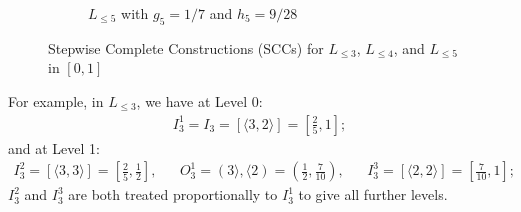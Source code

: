 \documentclass{ws-ijnt}
\newlength{\mytikzwidth}
\begin{document}
\begin{figure}
\begin{subfigure}[b]{\textwidth}
			
			\label{fig: L_5}
			\caption{ $L_{\leq 5}$ with $g_5=1/7$ and $h_5=9/28$}
		\end{subfigure}
		
		\caption{Stepwise Complete Constructions (SCCs) for $L_{\leq 3}$, $L_{\leq 4}$, and $L_{\leq 5}$ in $[0,1]$}
		\label{fig: L_3 L_4 L_5}
	\end{figure}
	
	For example, in $L_{\leq 3}$, we have at Level 0:
	\begin{align*}
		I_3^1=I_3=[\langle3,2\rangle]=\left[\frac{2}{5},1\right];
	\end{align*}
	and at Level 1:
	\begin{align*}
		I_3^2=[\langle3,3\rangle]=\left[\frac{2}{5},\frac{1}{2}\right], &&
		O_3^1=(3\rangle,\langle2)=\left(\frac{1}{2},\frac{7}{10}\right), &&
		I_3^3=[\langle2,2\rangle]=\left[\frac{7}{10},1\right];
	\end{align*}
	$I_3^2$ and $I_3^3$ are both treated proportionally to $I_{3}^{1}$ to give all further levels.
	
\end{document}
